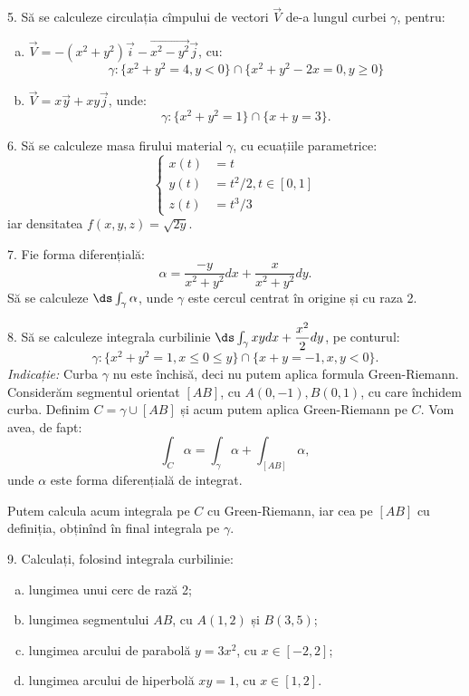 \vspace{1cm}

5. Să se calculeze circulația cîmpului de vectori $ \vec{V} $ de-a lungul curbei
$ \gamma $, pentru:
\begin{enumerate}[(a)]
\item $ \vec{V} = -(x^2 + y^2) \vec{i} - \vec{x^2 - y^2} \vec{j} $, cu:
  \[
    \gamma: \{ x^2 + y^2 = 4, y < 0 \} \cap \{ x^2 + y^2 - 2x = 0, y \geq 0 \}
  \]
\item $ \vec{V} = x\vec{y} + xy \vec{j} $, unde:
  \[
    \gamma: \{ x^2 + y^2 = 1 \} \cap \{ x + y = 3 \}.
  \]
\end{enumerate}

\vspace{1cm}

6. Să se calculeze masa firului material $ \gamma $, cu ecuațiile parametrice:
\[
  \begin{cases}
    x(t) &= t \\
    y(t) &= t^2/2, t \in [0, 1] \\
    z(t) &= t^3/3
  \end{cases}
\]
iar densitatea $ f(x, y, z) = \sqrt{2y} $.

\vspace{1cm}

7. Fie forma diferențială:
\[
  \alpha = \dfrac{-y}{x^2 + y^2} dx + \dfrac{x}{x^2 + y^2} dy.
\]
Să se calculeze $ \ds\int_\gamma \alpha $, unde $ \gamma $ este cercul centrat
în origine și cu raza 2.

\vspace{1cm}

8. Să se calculeze integrala curbilinie $ \ds\int_\gamma xydx + \dfrac{x^2}{2} dy $,
pe conturul:
\[
  \gamma : \{ x^2 + y^2 = 1, x \leq 0 \leq y \} \cap \{ x + y = -1, x, y < 0 \}.
\]
\emph{Indicație:} Curba $ \gamma $ nu este închisă, deci nu putem aplica
formula Green-Riemann. Considerăm segmentul orientat $ [AB] $, cu
$ A(0, -1), B(0, 1) $, cu care închidem curba. Definim $ C = \gamma \cup [AB] $
și acum putem aplica Green-Riemann pe $ C $. Vom avea, de fapt:
\[
  \int_C \alpha = \int_\gamma \alpha + \int_{[AB]} \alpha,
\]
unde $ \alpha $ este forma diferențială de integrat.

Putem calcula acum integrala pe $ C $ cu Green-Riemann, iar cea pe $ [AB] $ cu
definiția, obținînd în final integrala pe $ \gamma $.

\vspace{1cm}

9. Calculați, folosind integrala curbilinie:
\begin{enumerate}[(a)]
\item lungimea unui cerc de rază 2;
\item lungimea segmentului $ AB $, cu $ A(1, 2) $ și $ B(3, 5) $;
\item lungimea arcului de parabolă $ y = 3x^2 $, cu $ x \in [-2, 2] $;
\item lungimea arcului de hiperbolă $ xy = 1 $, cu $ x \in [1, 2] $.
\end{enumerate}

